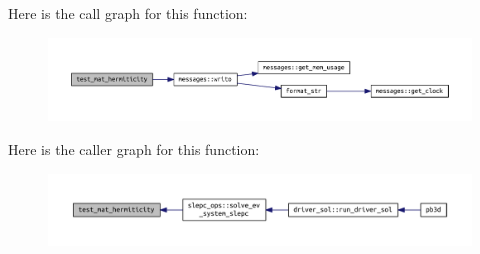 Here is the call graph for this function\+:
\nopagebreak
\begin{figure}[H]
\begin{center}
\leavevmode
\includegraphics[width=350pt]{SLEPC__ops_8f90_a07b637672a3e89fa9562a693995f857d_cgraph}
\end{center}
\end{figure}
Here is the caller graph for this function\+:
\nopagebreak
\begin{figure}[H]
\begin{center}
\leavevmode
\includegraphics[width=350pt]{SLEPC__ops_8f90_a07b637672a3e89fa9562a693995f857d_icgraph}
\end{center}
\end{figure}
